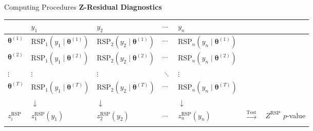\documentclass[
  ignorenonframetext,
]{beamer}
\newcounter{none} %
\begin{document}
\begin{frame}{Computing Procedures}
\textbf{Z-Residual Diagnostics}

{\def\LTcaptype{none} %
\begin{longtable}[]{@{}
  >{\raggedright\arraybackslash}p{}
  >{\raggedright\arraybackslash}p{}
  >{\raggedright\arraybackslash}p{}
  >{\raggedright\arraybackslash}p{}
  >{\raggedright\arraybackslash}p{}
  >{\raggedright\arraybackslash}p{}
  >{\raggedright\arraybackslash}p{}@{}}
\toprule\noalign{}
\begin{minipage}[b]{\linewidth}\raggedright
\end{minipage} & \begin{minipage}[b]{\linewidth}\raggedright
\(y_1\)
\end{minipage} & \begin{minipage}[b]{\linewidth}\raggedright
\(y_2\)
\end{minipage} & \begin{minipage}[b]{\linewidth}\raggedright
\(\cdots\)
\end{minipage} & \begin{minipage}[b]{\linewidth}\raggedright
\(y_n\)
\end{minipage} & \begin{minipage}[b]{\linewidth}\raggedright
\end{minipage} & \begin{minipage}[b]{\linewidth}\raggedright
\end{minipage} \\
\midrule\noalign{}
\endhead
\(\boldsymbol{\theta}^{(1)}\) &
\(\text{RSP}_1(y_1 \mid \boldsymbol{\theta}^{(1)})\) &
\(\text{RSP}_2(y_2 \mid \boldsymbol{\theta}^{(1)})\) & \(\cdots\) &
\(\text{RSP}_n(y_n \mid \boldsymbol{\theta}^{(1)})\) & & \\
\(\boldsymbol{\theta}^{(2)}\) &
\(\text{RSP}_1(y_1 \mid \boldsymbol{\theta}^{(2)})\) &
\(\text{RSP}_2(y_2 \mid \boldsymbol{\theta}^{(2)})\) & \(\cdots\) &
\(\text{RSP}_n(y_n \mid \boldsymbol{\theta}^{(2)})\) & & \\
\(\vdots\) & \(\vdots\) & \(\vdots\) & \(\ddots\) & \(\vdots\) & & \\
\(\boldsymbol{\theta}^{(T)}\) &
\(\text{RSP}_1(y_1 \mid \boldsymbol{\theta}^{(T)})\) &
\(\text{RSP}_2(y_2 \mid \boldsymbol{\theta}^{(T)})\) & \(\cdots\) &
\(\text{RSP}_n(y_n \mid \boldsymbol{\theta}^{(T)})\) & & \\
& \(\downarrow\) & \(\downarrow\) & & \(\downarrow\) & & \\
\(z_i^{\text{RSP}}\) & \(z^{\text{RSP}}_1(y_1)\) &
\(z^{\text{RSP}}_2(y_2)\) & \(\cdots\) & \(z^{\text{RSP}}_n(y_n)\) &
\(\xrightarrow{\text{Test}}\) & \(Z^{\text{RSP}}\) \(p\)-value \\
\bottomrule\noalign{}
\end{longtable}
}
\end{frame}
\end{document}
